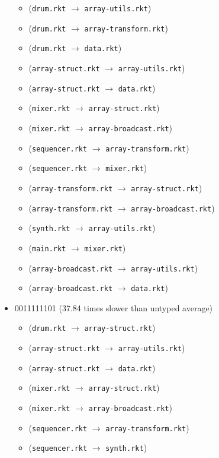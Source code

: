 \documentclass{article}
\newcommand{\mono}[1]{\texttt{#1}}
\begin{document}
\begin{itemize}
  \begin{itemize}
  \item (\mono{drum.rkt} $\rightarrow$ \mono{array-utils.rkt})
  \item (\mono{drum.rkt} $\rightarrow$ \mono{array-transform.rkt})
  \item (\mono{drum.rkt} $\rightarrow$ \mono{data.rkt})
  \item (\mono{array-struct.rkt} $\rightarrow$ \mono{array-utils.rkt})
  \item (\mono{array-struct.rkt} $\rightarrow$ \mono{data.rkt})
  \item (\mono{mixer.rkt} $\rightarrow$ \mono{array-struct.rkt})
  \item (\mono{mixer.rkt} $\rightarrow$ \mono{array-broadcast.rkt})
  \item (\mono{sequencer.rkt} $\rightarrow$ \mono{array-transform.rkt})
  \item (\mono{sequencer.rkt} $\rightarrow$ \mono{mixer.rkt})
  \item (\mono{array-transform.rkt} $\rightarrow$ \mono{array-struct.rkt})
  \item (\mono{array-transform.rkt} $\rightarrow$ \mono{array-broadcast.rkt})
  \item (\mono{synth.rkt} $\rightarrow$ \mono{array-utils.rkt})
  \item (\mono{main.rkt} $\rightarrow$ \mono{mixer.rkt})
  \item (\mono{array-broadcast.rkt} $\rightarrow$ \mono{array-utils.rkt})
  \item (\mono{array-broadcast.rkt} $\rightarrow$ \mono{data.rkt})
  \end{itemize}
\item 0011111101 (37.84 times slower than untyped average)
  \begin{itemize}
  \item (\mono{drum.rkt} $\rightarrow$ \mono{array-struct.rkt})
  \item (\mono{array-struct.rkt} $\rightarrow$ \mono{array-utils.rkt})
  \item (\mono{array-struct.rkt} $\rightarrow$ \mono{data.rkt})
  \item (\mono{mixer.rkt} $\rightarrow$ \mono{array-struct.rkt})
  \item (\mono{mixer.rkt} $\rightarrow$ \mono{array-broadcast.rkt})
  \item (\mono{sequencer.rkt} $\rightarrow$ \mono{array-transform.rkt})
  \item (\mono{sequencer.rkt} $\rightarrow$ \mono{synth.rkt})

\end{itemize}
\end{itemize}
\end{document}
